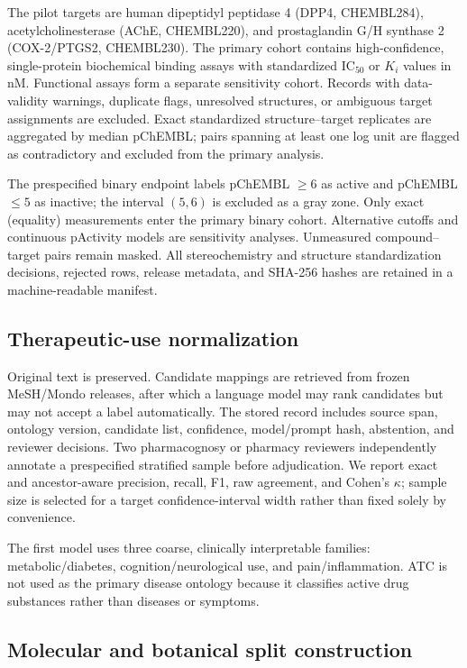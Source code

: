 \documentclass[11pt]{article}
\begin{document}
The pilot targets are human dipeptidyl peptidase 4 (DPP4, CHEMBL284),
acetylcholinesterase (AChE, CHEMBL220), and prostaglandin G/H synthase 2
(COX-2/PTGS2, CHEMBL230). The primary cohort contains high-confidence,
single-protein biochemical binding assays with standardized IC$_{50}$ or
$K_i$ values in nM. Functional assays form a separate sensitivity cohort.
Records with data-validity warnings, duplicate flags, unresolved structures, or
ambiguous target assignments are excluded. Exact standardized
structure--target replicates are aggregated by median pChEMBL; pairs spanning
at least one log unit are flagged as contradictory and excluded from the
primary analysis.

The prespecified binary endpoint labels pChEMBL $\geq 6$ as active and
pChEMBL $\leq 5$ as inactive; the interval $(5,6)$ is excluded as a gray zone.
Only exact (equality) measurements enter the primary binary cohort. Alternative
cutoffs and continuous pActivity models are sensitivity analyses. Unmeasured
compound--target pairs remain masked. All stereochemistry and structure
standardization decisions, rejected rows, release metadata, and SHA-256 hashes
are retained in a machine-readable manifest.

\subsection{Therapeutic-use normalization}

Original text is preserved. Candidate mappings are retrieved from frozen
MeSH/Mondo releases, after which a language model may rank candidates but may
not accept a label automatically. The stored record includes source span,
ontology version, candidate list, confidence, model/prompt hash, abstention,
and reviewer decisions. Two pharmacognosy or pharmacy reviewers independently
annotate a prespecified stratified sample before adjudication. We report exact
and ancestor-aware precision, recall, F1, raw agreement, and Cohen's $\kappa$;
sample size is selected for a target confidence-interval width rather than fixed
solely by convenience.

The first model uses three coarse, clinically interpretable families:
metabolic/diabetes, cognition/neurological use, and pain/inflammation. ATC is
not used as the primary disease ontology because it classifies active drug
substances rather than diseases or symptoms.

\subsection{Molecular and botanical split construction}
\end{document}
